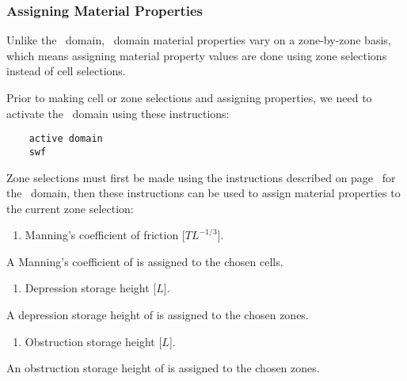 \subsubsection{Assigning Material Properties}  
Unlike the \gwf\ domain, \swf\ domain material properties vary on a zone-by-zone basis, which means assigning material property values are done using zone selections instead of cell selections.

%
Prior to making cell or zone selections and assigning properties, we need to activate the \swf\ domain using these instructions:
\begin{verbatim}
    active domain
    swf
\end{verbatim}

Zone selections must first be made using the instructions described on page~\pageref{page:zoneSelect} for the \gwf\ domain, then these instructions can be used to assign material properties to the current zone selection:

    {
        \squish
        \begin{enumerate}
        \item {}  Manning's coefficient of friction [$T L^{-1/3}$].
        \end{enumerate}
          A Manning's coefficient of  is assigned to the chosen cells.
    }

    {
        \squish
        \begin{enumerate}
        \item {}  Depression storage height [$L$].
        \end{enumerate}
          A depression storage height of  is assigned to the chosen zones.
    }

    {
        \squish
        \begin{enumerate}
        \item {}  Obstruction storage height [$L$].
        \end{enumerate}
          An obstruction storage height of  is assigned to the chosen zones.
    }

